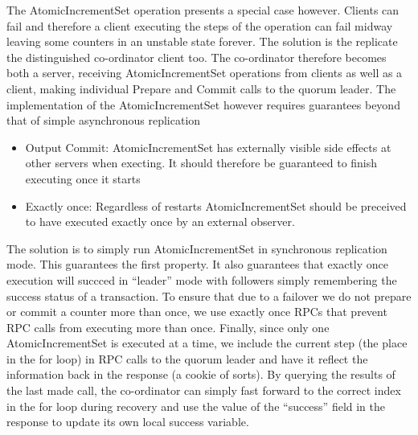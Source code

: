 \documentclass[twocolumn]{article}
\begin{document}
The AtomicIncrementSet operation presents a special case however. Clients can
fail and therefore a client executing the steps of the operation can fail midway
leaving some counters in an unstable state forever. The solution is the
replicate the distinguished co-ordinator client too. The co-ordinator therefore
becomes both a server, receiving AtomicIncrementSet operations from clients as
well as a client, making individual Prepare and Commit calls to the quorum
leader. The implementation of the AtomicIncrementSet however requires guarantees
beyond that of simple asynchronous replication

\begin{itemize}
  \item Output Commit: AtomicIncrementSet has externally visible side effects at
    other servers when execting. It should therefore be guaranteed to finish
    executing once it starts
  \item Exactly once: Regardless of restarts AtomicIncrementSet should be
    preceived to have executed exactly once by an external observer.
\end{itemize}

The solution is to simply run AtomicIncrementSet in synchronous replication
mode. This guarantees the first property. It also guarantees that exactly once
execution will succced in ``leader'' mode with followers simply remembering the
success status of a transaction. To ensure that due to a failover we do not
prepare or commit a counter more than once, we use exactly once RPCs that
prevent RPC calls from executing more than once. Finally, since only
one AtomicIncrementSet is executed at a time, we include the current step (the
place in the for loop) in RPC calls to the quorum leader and have it reflect the
information back in the response (a cookie of sorts). By querying the results of
the last made call, the co-ordinator can simply fast forward to the correct
index in the for loop during recovery and use the value of the ``success'' field
in the response to update its own local success variable.
\end{document}
